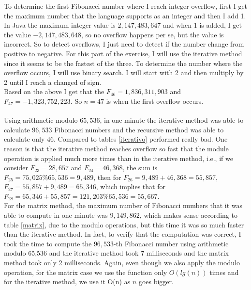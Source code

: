 \documentclass[12pt]{scrartcl}
\begin{document}
\begin{enumerate}
To determine the first Fibonacci number where I reach integer overflow, first I get the maximum number that the language supports as an integer and then I add 1. In Java the maximum integer value is $2,147,483,647$ and when $1$ is added, I get the value $-2,147,483,648$, so no overflow happens per se, but the value is incorrect. So to detect overflows, I just need to detect if the number change from positive to negative. For this part of the exercise, I will use the iterative method since it seems to be the fastest of the three. To determine the number where the overflow occurs, I will use binary search. I will start with 2 and then multiply by 2 until I reach a changed of sign.\\
Based on the above I get that the $F_{46} = 1,836,311,903$ and $F_{47} = -1,323,752,223$. So $n = 47$ is when the first overflow occurs.\\
\\
Using arithmetic modulo $65,536$, in one minute the iterative method was able to calculate $96,533$ Fibonacci numbers and the recursive method was able to calculate only $46$. Compared to tables \ref{iterativo} performed really bad. One reason is that the iterative method reaches overflow so fast that the module operation is applied much more times than in the iterative method, i.e., if we consider $F_{23} = 28,657$ and $F_{24} = 46,368$, the sum is $F_{25} = 75,025 \%  65,536 = 9,489$, then for $F_{26} = 9,489 + 46,368 = 55,857$, $F_{27} = 55,857 + 9,489 = 65,346$, which implies that for $F_{28} = 65,346 + 55,857 = 121,203 \% 65,536 = 55,667$. 
\\
For the matrix method, the maximum number of Fibonacci numbers that it was able to compute in one minute was $9,149,862$, which makes sense according to table \ref{matrix}, due to the modulo operations, but this time it was so much faster than the iterative method. In fact, to verify that the computation was correct, I took the time to compute the $96,533$-th Fibonacci number using arithmetic modulo 65,536 and the iterative method took 7 milliseconds and the matrix method took only 2 milliseconds. Again, even though we also apply the modulo operation, for the matrix case we use the function only $O(lg(n))$ times and for the iterative method, we use it O(n) as $n$ goes bigger.




\end{enumerate}
\end{document}
